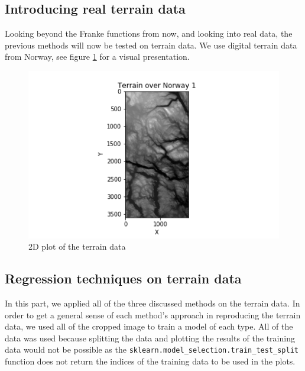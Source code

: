 \documentclass{article}
\begin{document}
\clearpage
\subsection{Introducing real terrain data}
Looking beyond the Franke functions from now, and looking into real data, the previous methods will now be tested on terrain data. We use digital terrain data from Norway, see figure \ref{terraindata} for a visual presentation. 
\begin{figure}[h]
\includegraphics[scale=0.9]{Plots/terrain2dplot.png}
\caption{2D plot of the terrain data}
\label{terraindata}
\end{figure}

\clearpage
\subsection{Regression techniques on terrain data}
In this part, we applied all of the three discussed methods on the terrain data. In order to get a general sense of each method's approach in reproducing the terrain data, we used all of the cropped image to train a model of each type. All of the data was used because splitting the data and plotting the results of the training data would not be possible as the \verb+sklearn.model_selection.train_test_split+ function does not return the indices of the training data to be used in the plots.
\end{document}

